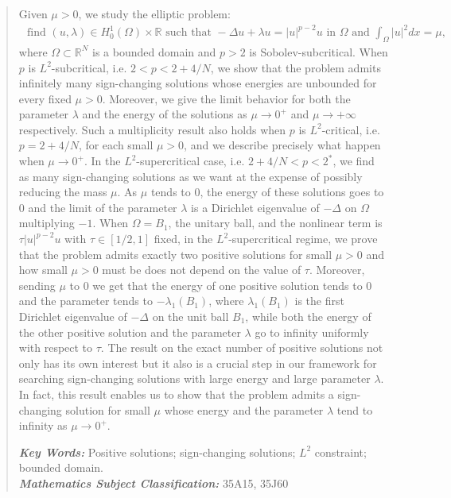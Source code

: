 \documentclass[10pt,a4paper]{article}
\theoremstyle{definition} \theoremstyle{remark}
\numberwithin{equation}{section}
\newcommand{\R}{\mathbb{R}}
\newcommand{\la}{\lambda}
\begin{document}
\begin{abstract}
	\noindent Given $\mu > 0$, we study the elliptic problem:
	\begin{align*}
		\text{ find } (u,\la) \in H_0^1(\Omega) \times \R \text{ such that } -\Delta u + \la u = |u|^{p-2}u \text{ in } \Omega \text{ and } \int_\Omega|u|^2dx = \mu,
	\end{align*}
    where $\Omega \subset \R^N$ is a bounded domain and $p > 2$ is Sobolev-subcritical. When $p$ is $L^2$-subcritical, i.e. $2 < p < 2 + 4/N$, we show that the problem admits infinitely many sign-changing solutions whose energies are unbounded for every fixed $\mu > 0$. Moreover, we give the limit behavior for both the parameter $\la$ and the energy of the solutions  as  $\mu \to 0^+$ and $\mu \to +\infty$ respectively. Such a multiplicity result also holds when $p$ is $L^2$-critical, i.e. $p = 2 + 4/N$, for each small $\mu > 0$, and we describe precisely what happen when $\mu \to 0^+$.  In the $L^2$-supercritical case, i.e. $2+4/N < p < 2^*$, we find as many sign-changing solutions as we want at the expense of possibly reducing the mass $\mu$. As $\mu$ tends to $0$, the energy of these solutions goes to $0$ and the limit of the parameter $\la$ is a Dirichlet eigenvalue of $-\Delta$ on $\Omega$ multiplying $-1$. When $\Omega = B_1$, the unitary ball, and the nonlinear term is $\tau |u|^{p-2}u$ with $\tau \in [1/2,1]$ fixed, in the $L^2$-supercritical regime, we prove that the problem admits exactly two positive solutions for small $\mu > 0$ and how small $\mu > 0$ must be does not depend on the value of $\tau$. Moreover, sending $\mu$ to $0$ we get that the energy of one positive solution tends to $0$ and the parameter tends to $-\la_1(B_1)$, where $\la_1(B_1)$ is the first Dirichlet eigenvalue of $-\Delta $ on the unit ball $B_1$, while both the energy of the other positive solution and the parameter $\la$ go to infinity uniformly with respect to $\tau$. The result on the exact number of positive solutions not only  has its own interest but it  also is a crucial step in our framework for  searching  sign-changing solutions with large energy and large parameter $\la$. In fact, this result enables us to show that the problem admits a sign-changing solution for small $\mu$ whose energy and the parameter $\la$ tend to infinity as $\mu \to 0^+$.


\medskip

{\small \noindent \textit{\bf Key Words:} Positive solutions; sign-changing solutions; $L^2$ constraint; bounded domain.\\
\textit{\bf Mathematics Subject Classification:} 35A15, 35J60}



\end{abstract}
\end{document}
